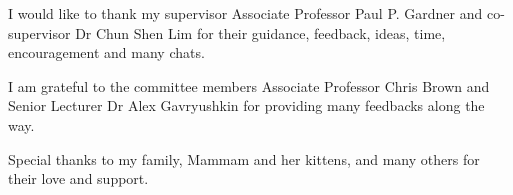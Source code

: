 \begin{acknowledgements}
I would like to thank my supervisor Associate Professor Paul P. Gardner and  co-supervisor Dr Chun Shen Lim for their guidance, feedback, ideas, time, encouragement and many chats. 

I am grateful to the committee members Associate Professor Chris Brown and Senior Lecturer Dr Alex Gavryushkin for providing many feedbacks along the way. 


Special thanks to my family, Mammam and her kittens, and many others for their love and support.

\end{acknowledgements}